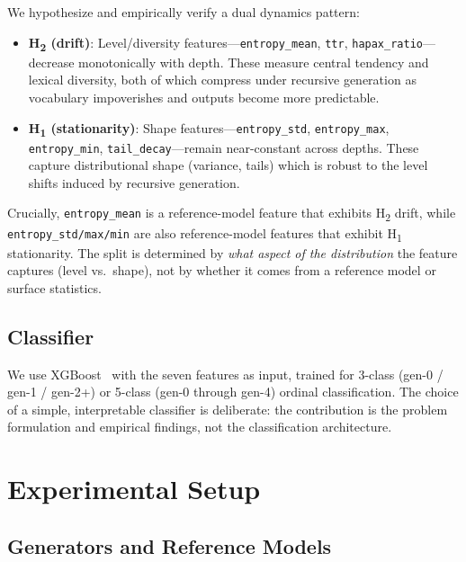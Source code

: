 \documentclass[letterpaper]{article}
\newcommand{\feat}[1]{\texttt{#1}}
\newcommand{\htwo}{H\textsubscript{2}}
\newcommand{\hone}{H\textsubscript{1}}
\begin{document}
We hypothesize and empirically verify a dual dynamics pattern:

\begin{itemize}
    \item \textbf{\htwo{} (drift)}: Level/diversity features---\feat{entropy\_mean}, \feat{ttr}, \feat{hapax\_ratio}---decrease monotonically with depth. These measure central tendency and lexical diversity, both of which compress under recursive generation as vocabulary impoverishes and outputs become more predictable.
    \item \textbf{\hone{} (stationarity)}: Shape features---\feat{entropy\_std}, \feat{entropy\_max}, \feat{entropy\_min}, \feat{tail\_decay}---remain near-constant across depths. These capture distributional shape (variance, tails) which is robust to the level shifts induced by recursive generation.
\end{itemize}

Crucially, \feat{entropy\_mean} is a reference-model feature that exhibits \htwo{} drift, while \feat{entropy\_std/max/min} are also reference-model features that exhibit \hone{} stationarity.
The split is determined by \emph{what aspect of the distribution} the feature captures (level vs.\ shape), not by whether it comes from a reference model or surface statistics.

\subsection{Classifier}

We use XGBoost~\citep{chen2016xgboost} with the seven features as input, trained for 3-class (gen-0 / gen-1 / gen-2+) or 5-class (gen-0 through gen-4) ordinal classification.
The choice of a simple, interpretable classifier is deliberate: the contribution is the problem formulation and empirical findings, not the classification architecture.

\section{Experimental Setup}

\subsection{Generators and Reference Models}
\end{document}
